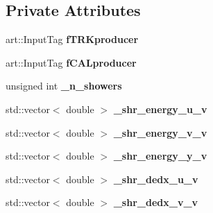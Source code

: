 \subsection*{Private Attributes}
\begin{DoxyCompactItemize}
\item 
art\+::\+Input\+Tag {\bfseries f\+T\+R\+Kproducer}\hypertarget{classanalysis_1_1ShowerAnalysis_aaf85b896fee0cd1a3f089e14c48d6849}{}\label{classanalysis_1_1ShowerAnalysis_aaf85b896fee0cd1a3f089e14c48d6849}

\item 
art\+::\+Input\+Tag {\bfseries f\+C\+A\+Lproducer}\hypertarget{classanalysis_1_1ShowerAnalysis_afc78776f278428b5919f03dc97d71789}{}\label{classanalysis_1_1ShowerAnalysis_afc78776f278428b5919f03dc97d71789}

\item 
unsigned int {\bfseries \+\_\+n\+\_\+showers}\hypertarget{classanalysis_1_1ShowerAnalysis_a421f0c13019ec5da2784f611b43cfe2d}{}\label{classanalysis_1_1ShowerAnalysis_a421f0c13019ec5da2784f611b43cfe2d}

\item 
std\+::vector$<$ double $>$ {\bfseries \+\_\+shr\+\_\+energy\+\_\+u\+\_\+v}\hypertarget{classanalysis_1_1ShowerAnalysis_ade84262e802b7aa45c8745cc7be69fd1}{}\label{classanalysis_1_1ShowerAnalysis_ade84262e802b7aa45c8745cc7be69fd1}

\item 
std\+::vector$<$ double $>$ {\bfseries \+\_\+shr\+\_\+energy\+\_\+v\+\_\+v}\hypertarget{classanalysis_1_1ShowerAnalysis_a38a0debe51fc30481458de0cbf00272d}{}\label{classanalysis_1_1ShowerAnalysis_a38a0debe51fc30481458de0cbf00272d}

\item 
std\+::vector$<$ double $>$ {\bfseries \+\_\+shr\+\_\+energy\+\_\+y\+\_\+v}\hypertarget{classanalysis_1_1ShowerAnalysis_ada81e99cc9d01b13ee0a93c593468d6f}{}\label{classanalysis_1_1ShowerAnalysis_ada81e99cc9d01b13ee0a93c593468d6f}

\item 
std\+::vector$<$ double $>$ {\bfseries \+\_\+shr\+\_\+dedx\+\_\+u\+\_\+v}\hypertarget{classanalysis_1_1ShowerAnalysis_ab64b3e69b214ab3630995a5d6bf3a379}{}\label{classanalysis_1_1ShowerAnalysis_ab64b3e69b214ab3630995a5d6bf3a379}

\item 
std\+::vector$<$ double $>$ {\bfseries \+\_\+shr\+\_\+dedx\+\_\+v\+\_\+v}\hypertarget{classanalysis_1_1ShowerAnalysis_ad212e61eceac2d645e406eda4954533c}{}\label{classanalysis_1_1ShowerAnalysis_ad212e61eceac2d645e406eda4954533c}


\end{DoxyCompactItemize}
